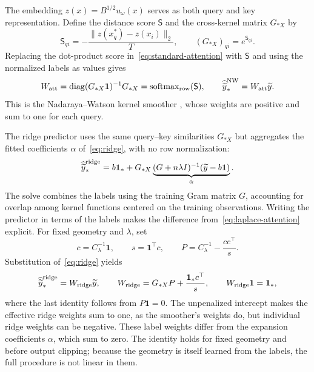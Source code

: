 \documentclass[11pt]{article}
\newcommand{\one}{\bm 1}
\begin{document}
The embedding $z(x)=B^{1/2}u_\omega(x)$ serves as both query and key representation. Define the distance score $\mathsf S$ and the cross-kernel matrix $G_{*X}$ by
\begin{equation}
 \mathsf S_{qi}=-\frac{\|z(x_q^*)-z(x_i)\|_2}{T},\qquad
 (G_{*X})_{qi}=e^{\mathsf S_{qi}}.
\end{equation}
Replacing the dot-product score in~\eqref{eq:standard-attention} with $\mathsf S$ and using the normalized labels as values gives
\begin{equation}
 W_{\rm att}=\operatorname{diag}(G_{*X}\one)^{-1}G_{*X}
             =\operatorname{softmax}_{\rm row}(\mathsf S),\qquad
 \widehat{\widetilde y}_*^{\rm NW}=W_{\rm att}\widetilde y.
 \label{eq:laplace-attention}
\end{equation}
This is the Nadaraya--Watson kernel smoother \cite{nadaraya1964,watson1964}, whose weights are positive and sum to one for each query.

The ridge predictor uses the same query--key similarities $G_{*X}$ but aggregates the fitted coefficients $\alpha$ of~\eqref{eq:ridge}, with no row normalization:
\begin{equation}
 \widehat{\widetilde y}_*^{\rm ridge}
 =b\one_*+G_{*X}\underbrace{(G+n\lambda I)^{-1}
                         (\widetilde y-b\one)}_{\alpha}.
 \label{eq:ridge-attention}
\end{equation}
The solve combines the labels using the training Gram matrix $G$, accounting for overlap among kernel functions centered on the training observations. Writing the predictor in terms of the labels makes the difference from~\eqref{eq:laplace-attention} explicit. For fixed geometry and $\lambda$, set
\begin{equation}
 c=C_\lambda^{-1}\one,\qquad s=\one^\top c,\qquad
 P=C_\lambda^{-1}-\frac{cc^\top}{s}.
\end{equation}
Substitution of~\eqref{eq:ridge} yields
\begin{equation}
 \widehat{\widetilde y}_*^{\rm ridge}=W_{\rm ridge}\widetilde y,
 \qquad W_{\rm ridge}=G_{*X}P+\frac{\one_*c^\top}{s},
 \qquad W_{\rm ridge}\one=\one_*,
 \label{eq:effective-ridge-weights}
\end{equation}
where the last identity follows from $P\one=0$. The unpenalized intercept makes the effective ridge weights sum to one, as the smoother's weights do, but individual ridge weights can be negative. These label weights differ from the expansion coefficients $\alpha$, which sum to zero. The identity holds for fixed geometry and before output clipping; because the geometry is itself learned from the labels, the full procedure is not linear in them.
\end{document}
